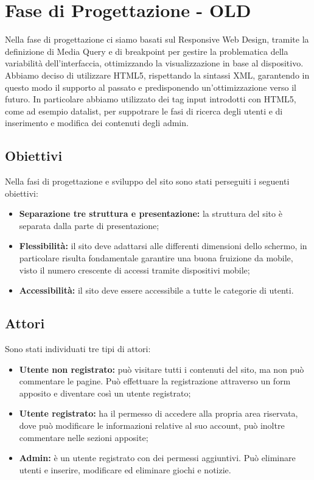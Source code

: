 \section{Fase di Progettazione - OLD}
Nella fase di progettazione ci siamo basati sul Responsive Web Design, tramite la definizione di Media Query e di
breakpoint per gestire la problematica della variabilità dell'interfaccia, ottimizzando la visualizzazione in base al dispositivo.
Abbiamo deciso di utilizzare HTML5, rispettando la sintassi XML, garantendo in questo modo il supporto al passato e predisponendo un'ottimizzazione verso il futuro.
In particolare abbiamo utilizzato dei tag input introdotti con HTML5, come ad esempio datalist, per suppotrare le fasi di ricerca degli utenti e di inserimento e modifica dei contenuti degli admin. 

\subsection{Obiettivi}
Nella fasi di progettazione e sviluppo del sito sono stati perseguiti i seguenti obiettivi:
\begin{itemize}
	\item  \textbf{Separazione tre struttura e presentazione:} la struttura del sito è separata dalla parte di presentazione;
	\item  \textbf{Flessibilità:} il sito deve adattarsi alle differenti dimensioni dello schermo, in particolare risulta fondamentale garantire una buona fruizione da mobile, visto il numero crescente di accessi tramite dispositivi mobile;
	\item  \textbf{Accessibilità:} il sito deve essere accessibile a tutte le categorie di utenti.
\end{itemize}

\subsection{Attori}
Sono stati individuati tre tipi di attori:
\begin{itemize}
	\item \textbf{Utente non registrato:} può visitare tutti i contenuti del sito, ma non può commentare le pagine. Può effettuare la registrazione attraverso un form apposito e diventare così un utente registrato;
	\item \textbf{Utente registrato:} ha il permesso di accedere alla propria area riservata, dove può modificare le informazioni relative al suo account, può inoltre commentare nelle sezioni apposite;
	\item \textbf{Admin:} è un utente registrato con dei permessi aggiuntivi. Può eliminare utenti e inserire, modificare ed eliminare giochi e notizie.
\end{itemize}


